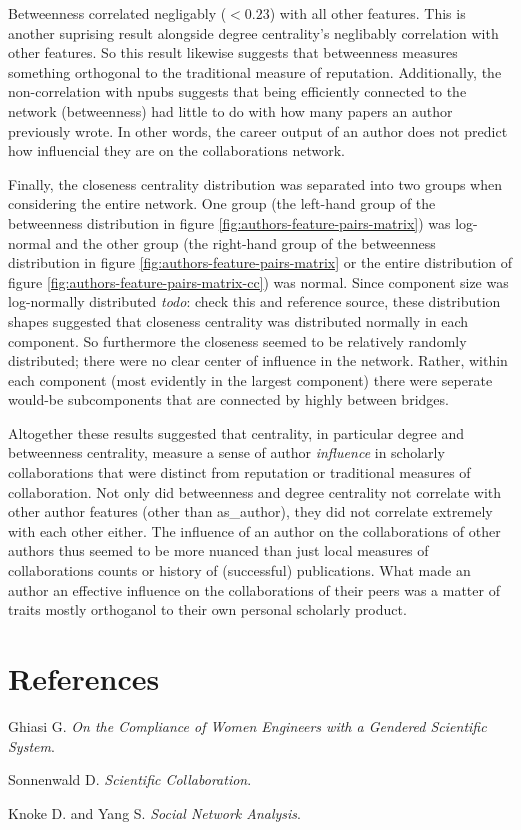 \documentclass{article}
\newcommand{\todo}[1]{\textit{todo}: #1}
\begin{document}
Betweenness correlated negligably ($< 0.23$) with all other features.
This is another suprising result alongside degree centrality's neglibably correlation with other features.
So this result likewise suggests that betweenness measures something orthogonal to the traditional measure of reputation.
Additionally, the non-correlation with npubs suggests that being efficiently connected to the network (betweenness) had little to do with how many papers an author previously wrote. In other words, the career output of an author does not predict how influencial they are on the collaborations network.

Finally, the closeness centrality distribution was separated into two groups when considering the entire network. One group (the left-hand group of the betweenness distribution in figure \ref{fig:authors-feature-pairs-matrix}) was log-normal and the other group (the right-hand group of the betweenness distribution in figure \ref{fig:authors-feature-pairs-matrix} or the entire distribution of figure \ref{fig:authors-feature-pairs-matrix-cc}) was normal.
Since component size was log-normally distributed \todo{check this and reference source}, these distribution shapes suggested that closeness centrality was distributed normally in each component.
So furthermore the closeness seemed to be relatively randomly distributed; there were no clear center of influence in the network.
Rather, within each component (most evidently in the largest component) there were seperate would-be subcomponents that are connected by highly between bridges.


Altogether these results suggested that centrality, in particular degree and betweenness centrality, measure a sense of author \textit{influence} in scholarly collaborations that were distinct from reputation or traditional measures of collaboration.
Not only did betweenness and degree centrality not correlate with other author features (other than as\_author), they did not correlate extremely with each other either.
The influence of an author on the collaborations of other authors thus seemed to be more nuanced than just local measures of collaborations counts or history of (successful) publications. What made an author an effective influence on the collaborations of their peers was a matter of traits mostly orthoganol to their own personal scholarly product.


\section*{References}

\noindent
Ghiasi G. \textit{On the Compliance of Women Engineers with a Gendered Scientific System}.

\noindent
Sonnenwald D. \textit{Scientific Collaboration}.

\noindent
Knoke D. and Yang S. \textit{Social Network Analysis}.
\end{document}
